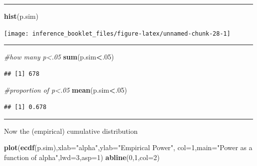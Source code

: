 \documentclass[]{article}
\newenvironment{Shaded}{\begin{snugshade}}{\end{snugshade}}
\newcommand{\KeywordTok}[1]{\textcolor[rgb]{0.13,0.29,0.53}{\textbf{#1}}}
\newcommand{\DataTypeTok}[1]{\textcolor[rgb]{0.13,0.29,0.53}{#1}}
\newcommand{\DecValTok}[1]{\textcolor[rgb]{0.00,0.00,0.81}{#1}}
\newcommand{\StringTok}[1]{\textcolor[rgb]{0.31,0.60,0.02}{#1}}
\newcommand{\CommentTok}[1]{\textcolor[rgb]{0.56,0.35,0.01}{\textit{#1}}}
\newcommand{\OperatorTok}[1]{\textcolor[rgb]{0.81,0.36,0.00}{\textbf{#1}}}
\newcommand{\NormalTok}[1]{#1}
\begin{document}
\begin{center}\rule{0.5\linewidth}{\linethickness}\end{center}

\begin{Shaded}
\begin{Highlighting}[]
\KeywordTok{hist}\NormalTok{(p.sim)}
\end{Highlighting}
\end{Shaded}

\begin{center}\texttt{[image: inference\_booklet\_files/figure-latex/unnamed-chunk-28-1]} \end{center}

\begin{center}\rule{0.5\linewidth}{\linethickness}\end{center}

\begin{Shaded}
\begin{Highlighting}[]
\CommentTok{#how many p<.05}
\KeywordTok{sum}\NormalTok{(p.sim}\OperatorTok{<}\NormalTok{.}\DecValTok{05}\NormalTok{)}
\end{Highlighting}
\end{Shaded}

\begin{verbatim}
## [1] 678
\end{verbatim}

\begin{Shaded}
\begin{Highlighting}[]
\CommentTok{#proportion of p<.05}
\KeywordTok{mean}\NormalTok{(p.sim}\OperatorTok{<}\NormalTok{.}\DecValTok{05}\NormalTok{)}
\end{Highlighting}
\end{Shaded}

\begin{verbatim}
## [1] 0.678
\end{verbatim}

\begin{center}\rule{0.5\linewidth}{\linethickness}\end{center}

Now the (empirical) cumulative distribution

\begin{Shaded}
\begin{Highlighting}[]
\KeywordTok{plot}\NormalTok{(}\KeywordTok{ecdf}\NormalTok{(p.sim),}\DataTypeTok{xlab=}\StringTok{"alpha"}\NormalTok{,}\DataTypeTok{ylab=}\StringTok{"Empirical Power"}\NormalTok{, }\DataTypeTok{col=}\DecValTok{1}\NormalTok{,}\DataTypeTok{main=}\StringTok{"Power as a function of alpha"}\NormalTok{,}\DataTypeTok{lwd=}\DecValTok{3}\NormalTok{,}\DataTypeTok{asp=}\DecValTok{1}\NormalTok{)}
\KeywordTok{abline}\NormalTok{(}\DecValTok{0}\NormalTok{,}\DecValTok{1}\NormalTok{,}\DataTypeTok{col=}\DecValTok{2}\NormalTok{)}
\end{Highlighting}
\end{Shaded}
\end{document}
